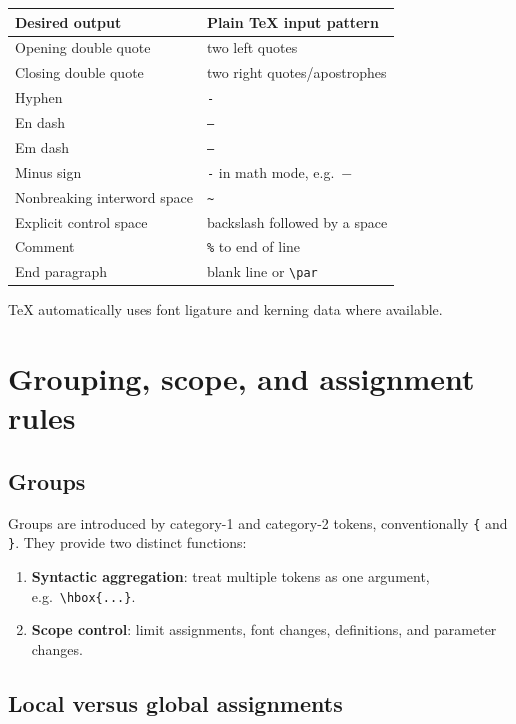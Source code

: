 \documentclass[11pt]{article}
\newcommand{\tightlist}{}
\begin{document}
\begin{longtable}[]{@{}ll@{}}
\toprule\noalign{}
Desired output & Plain TeX input pattern \\
\midrule\noalign{}
\endhead
\bottomrule\noalign{}
\endlastfoot
Opening double quote & two left quotes \\
Closing double quote & two right quotes/apostrophes \\
Hyphen & \texttt{-} \\
En dash & \texttt{--} \\
Em dash & \texttt{---} \\
Minus sign & \texttt{-} in math mode, e.g.~\texttt{$-$} \\
Nonbreaking interword space & \texttt{\~} \\
Explicit control space & backslash followed by a space \\
Comment & \texttt{\%} to end of line \\
End paragraph & blank line or \texttt{\textbackslash{}par} \\
\end{longtable}

TeX automatically uses font ligature and kerning data where available.

\section{Grouping, scope, and assignment rules}\label{grouping-scope-and-assignment-rules}

\subsection{Groups}\label{groups}

Groups are introduced by category-1 and category-2 tokens, conventionally \texttt{\{} and \texttt{\}}. They provide two distinct functions:

\begin{enumerate}
\def\labelenumi{\arabic{enumi}.}
\tightlist
\item
  \textbf{Syntactic aggregation}: treat multiple tokens as one argument, e.g.~\texttt{\textbackslash{}hbox\{...\}}.
\item
  \textbf{Scope control}: limit assignments, font changes, definitions, and parameter changes.
\end{enumerate}

\subsection{Local versus global assignments}\label{local-versus-global-assignments}
\end{document}
